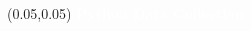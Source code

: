 \documentclass[aspectratio=169]{beamer} %
\begin{document}
\begin{frame}{}
    \setlength{\TPHorizModule}{\textwidth}
    \setlength{\TPVertModule}{\textwidth}
    \begin{textblock}{0.74} (0.05,0.05)
        \bfseries\large\textcolor{white}{Python Data Collection}
    \end{textblock}
    \begin{columns}
    \begin{column}{0.5\textwidth}
        \begin{itemize}


\end{itemize}
\end{column}
\end{columns}
\end{frame}
\end{document}
